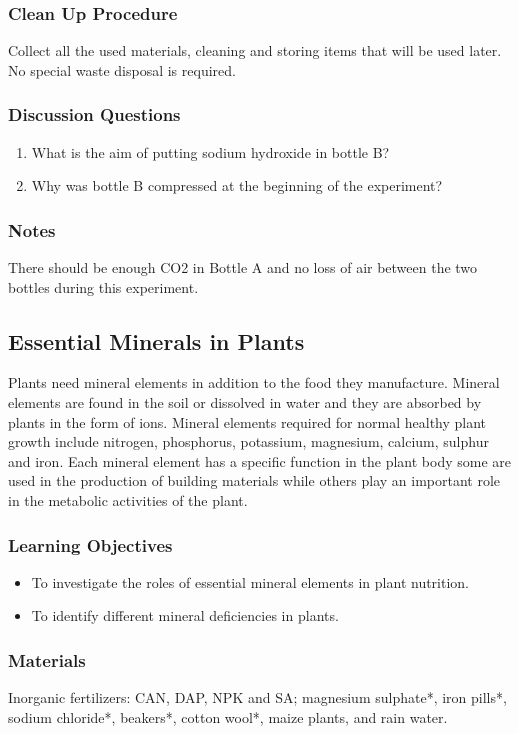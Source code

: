 \subsubsection*{Clean Up Procedure}
Collect all the used materials, cleaning and storing items that will be used later. No special waste disposal is required.

\subsubsection*{Discussion Questions}
\begin{enumerate}
\item{What is the aim of putting sodium hydroxide in bottle B?}
\item{Why was bottle B compressed at the beginning of the experiment?}
\end{enumerate}

\subsubsection*{Notes}
There should be enough {CO2} in Bottle A and no loss of air between the two bottles during this experiment.

\subsection{Essential Minerals in Plants}
Plants need mineral elements in addition to the food they manufacture. Mineral elements are found in the soil or dissolved in water and they are absorbed by plants in the form of ions. Mineral elements required for normal healthy plant growth include nitrogen, phosphorus, potassium, magnesium, calcium, sulphur and iron. Each mineral element has a specific function in the plant body some are used in the production of building materials while others play an important role in the metabolic activities of the plant.

\subsubsection*{Learning Objectives}
\begin{itemize}
\item{To investigate the roles of essential mineral elements in plant nutrition.}
\item{To identify different mineral deficiencies in plants.}
\end{itemize}

\subsubsection*{Materials}
Inorganic fertilizers: CAN, DAP, NPK and SA; magnesium sulphate*, iron pills*, sodium chloride*, beakers*, cotton wool*, maize plants, and rain water.

